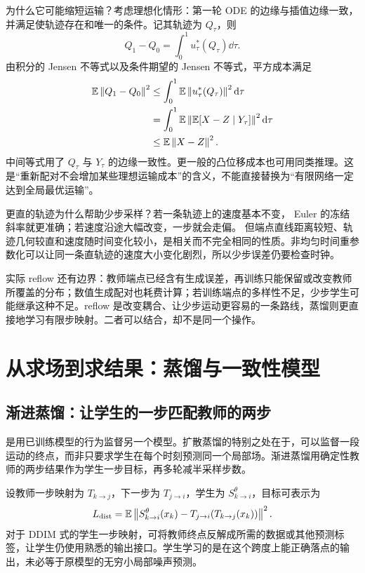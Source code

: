 为什么它可能缩短运输？考虑理想化情形：第一轮 ODE 的边缘与插值边缘一致，并满足使轨迹存在和唯一的条件。记其轨迹为 $Q_\tau$，则
\[
 Q_1-Q_0=\int_0^1u^*_\tau(Q_\tau)\dd\tau.
\]
由积分的 Jensen 不等式以及条件期望的 Jensen 不等式，平方成本满足
\begin{align}
\mathbb{E}\left\lVert Q_1-Q_0\right\rVert^2
&\leq \int_0^1\mathbb{E}\left\lVert u^*_\tau(Q_\tau)\right\rVert^2\mathop{}\!\mathrm{d}\tau\\*
&=\int_0^1\mathbb{E}\left\lVert\mathbb{E}[X-Z\mid Y_\tau]\right\rVert^2\mathop{}\!\mathrm{d}\tau\\*
&\leq \mathbb{E}\left\lVert X-Z\right\rVert^2.
\label{eq:m-reflow-cost}
\end{align}
中间等式用了 $Q_\tau$ 与 $Y_\tau$ 的边缘一致性。更一般的凸位移成本也可用同类推理。这是“重新配对不会增加某些理想运输成本”的含义，不能直接替换为“有限网络一定达到全局最优运输”。

更直的轨迹为什么帮助少步采样？若一条轨迹上的速度基本不变，
Euler 的冻结斜率就更准确；若速度沿途大幅改变，一步就会走偏。
但端点直线距离较短、轨迹几何较直和速度随时间变化较小，是相关而不完全相同的性质。非均匀时间重参数化可以让同一条直轨迹的速度大小变化剧烈，所以少步误差仍要检查时钟。

实际 reflow 还有边界：教师端点已经含有生成误差，再训练只能保留或改变教师所覆盖的分布；数值生成配对也耗费计算；若训练端点的多样性不足，少步学生可能继承这种不足。reflow 是改变耦合、让少步运动更容易的一条路线，蒸馏则更直接地学习有限步映射。二者可以结合，却不是同一个操作。

\section{从求场到求结果：蒸馏与一致性模型}
\label{sec:m-distillation}

\subsection{渐进蒸馏：让学生的一步匹配教师的两步}

是用已训练模型的行为监督另一个模型。扩散蒸馏的特别之处在于，可以监督一段运动的终点，而非只要求学生在每个时刻预测同一个局部场。渐进蒸馏用确定性教师的两步结果作为学生一步目标，再多轮减半采样步数。\cite{r_vpred}

设教师一步映射为 $T_{k\to j}$，下一步为 $T_{j\to i}$，学生为
$S^\theta_{k\to i}$，目标可表示为
\begin{equation}
L_{\mathrm{dist}}
=\mathbb{E}\left\lVert S^\theta_{k\to i}(x_k)
-T_{j\to i}(T_{k\to j}(x_k))\right\rVert^2.
\label{eq:m-distill}
\end{equation}
对于 DDIM 式的学生一步映射，可将教师终点反解成所需的数据或其他预测标签，让学生仍使用熟悉的输出接口。学生学习的是在这个跨度上能正确落点的输出，未必等于原模型的无穷小局部噪声预测。

